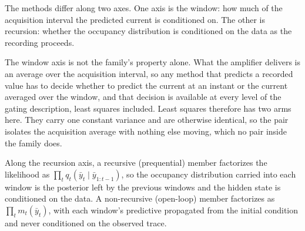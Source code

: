 The methods differ along two axes. One axis is the window: how much of the acquisition
interval the predicted current is conditioned on. The other is recursion: whether the
occupancy distribution is conditioned on the data as the recording proceeds.

The window axis is not the family's property alone. What the amplifier delivers is an
average over the acquisition interval, so any method that predicts a recorded value has to
decide whether to predict the current at an instant or the current averaged over the
window, and that decision is available at every level of the gating description, least
squares included. Least squares therefore has two arms here. They carry one constant
variance and are otherwise identical, so the pair isolates the acquisition average with
nothing else moving, which no pair inside the family does.

Along the recursion axis, a recursive (prequential) member factorizes the likelihood as
$\prod_t q_t(\bar{y}_t \mid \bar{y}_{1:t-1})$, so the occupancy distribution carried into
each window is the posterior left by the previous windows and the hidden state is
conditioned on the data. A non-recursive (open-loop) member factorizes as
$\prod_t m_t(\bar{y}_t)$, with each window's predictive propagated from the initial
condition and never conditioned on the observed trace.

